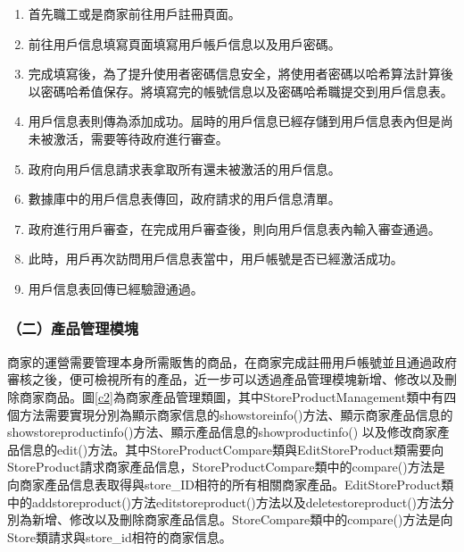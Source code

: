 	\begin{enumerate}
	\item 首先職工或是商家前往用戶註冊頁面。
	\item 前往用戶信息填寫頁面填寫用戶帳戶信息以及用戶密碼。
	\item 完成填寫後，為了提升使用者密碼信息安全，將使用者密碼以哈希算法計算後以密碼哈希值保存。將填寫完的帳號信息以及密碼哈希職提交到用戶信息表。
	\item 用戶信息表則傳為添加成功。屆時的用戶信息已經存儲到用戶信息表內但是尚未被激活，需要等待政府進行審查。
	\item 政府向用戶信息請求表拿取所有還未被激活的用戶信息。
	\item 數據庫中的用戶信息表傳回，政府請求的用戶信息清單。
	\item 政府進行用戶審查，在完成用戶審查後，則向用戶信息表內輸入審查通過。
	\item 此時，用戶再次訪問用戶信息表當中，用戶帳號是否已經激活成功。
	\item 用戶信息表回傳已經驗證通過。
	\end{enumerate}


\subsubsection{（二）產品管理模塊}
商家的運營需要管理本身所需販售的商品，在商家完成註冊用戶帳號並且通過政府審核之後，便可檢視所有的產品，近一步可以透過產品管理模塊新增、修改以及刪除商家商品。圖\ref{c2}為商家產品管理類圖，其中StoreProductManagement類中有四個方法需要實現分別為顯示商家信息的showstoreinfo()方法、顯示商家產品信息的showstoreproductinfo()方法、顯示產品信息的showproductinfo()
以及修改商家產品信息的edit()方法。其中StoreProductCompare類與EditStoreProduct類需要向StoreProduct請求商家產品信息，StoreProductCompare類中的compare()方法是向商家產品信息表取得與store\_ID相符的所有相關商家產品。EditStoreProduct類中的addstoreproduct()方法editstoreproduct()方法以及deletestoreproduct()方法分別為新增、修改以及刪除商家產品信息。StoreCompare類中的compare()方法是向Store類請求與store\_id相符的商家信息。

